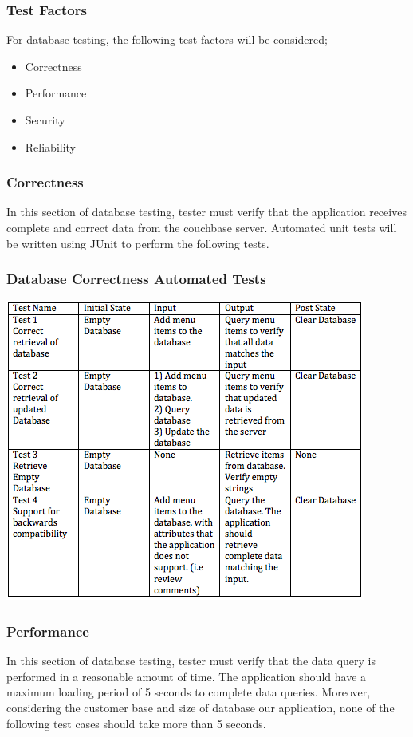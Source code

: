 \documentclass[12pt]{article}
\begin{document}
\subsubsection{Test Factors}
For database testing, the following test factors will be considered;
\begin{itemize}
 \item Correctness
 \item Performance
 \item Security
 \item Reliability
 \end{itemize}
 
\subsubsection{Correctness}
In this section of database testing, tester must verify that the application receives complete and correct data from the couchbase server. Automated unit tests will be written using JUnit to perform the following tests.
\subsubsection{Database Correctness Automated Tests }
\includegraphics[width=\textwidth,height=\textheight,keepaspectratio]{correctness_tests.png}

\subsubsection{Performance}
In this section of database testing, tester must verify that the data query is performed in a reasonable amount of time. The application should have a maximum loading period of 5 seconds to complete data queries. Moreover, considering the customer base and size of database our application, none of the following test cases should take more than 5 seconds.
\end{document}
